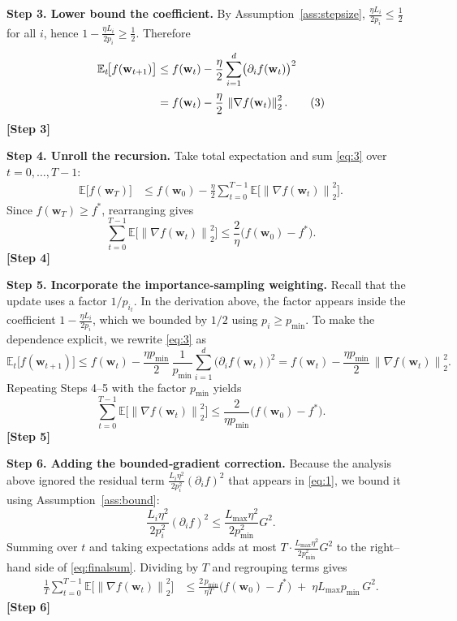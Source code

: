 \documentclass[11pt]{article}
\newcommand{\EE}{\mathbb{E}}
\newcommand{\norm}[1]{\left\|#1\right\|}
\newcommand{\grad}[1]{\nabla #1}
\begin{document}
\bigskip
\noindent\textbf{Step 3. Lower bound the coefficient.}  
By Assumption~\ref{ass:stepsize},
$\displaystyle \frac{\eta L_i}{2p_i}\le\frac12$ for all $i$, hence
$1-\frac{\eta L_i}{2p_i}\ge\frac12$.  Therefore
\begin{align}
\EE_t\!\bigl[f(\mathbf{w}_{t+1})\bigr]
&\le f(\mathbf{w}_t)
- \frac{\eta}{2}\sum_{i=1}^{d}
\bigl(\partial_i f(\mathbf{w}_t)\bigr)^{2}
\notag\\[0.4ex]
&= f(\mathbf{w}_t)-\frac{\eta}{2}\,\norm{\grad f(\mathbf{w}_t)}_2^{2}.
\tag{3}
\end{align}
\noindent\textbf{[Step 3]}

\bigskip
\noindent\textbf{Step 4. Unroll the recursion.}  
Take total expectation and sum \eqref{eq:3} over $t=0,\dots ,T-1$:
\begin{align}
\EE\!\bigl[f(\mathbf{w}_T)\bigr]
&\le f(\mathbf{w}_0)-\frac{\eta}{2}\sum_{t=0}^{T-1}
\EE\!\bigl[\norm{\grad f(\mathbf{w}_t)}_2^{2}\bigr].
\tag{4}
\end{align}
Since $f(\mathbf{w}_T)\ge f^{*}$, rearranging gives
\[
\sum_{t=0}^{T-1}\EE\!\bigl[\norm{\grad f(\mathbf{w}_t)}_2^{2}\bigr]
\le \frac{2}{\eta}\bigl(f(\mathbf{w}_0)-f^{*}\bigr).
\tag{5}
\]
\noindent\textbf{[Step 4]}

\bigskip
\noindent\textbf{Step 5. Incorporate the importance‑sampling weighting.}  
Recall that the update uses a factor $1/p_{i_t}$.  In the derivation above,
the factor appears inside the coefficient
$1-\frac{\eta L_i}{2p_i}$, which we bounded by $1/2$ using
$p_i\ge p_{\min}$.  To make the dependence explicit, we rewrite
\eqref{eq:3} as
\[
\EE_t\!\bigl[f(\mathbf{w}_{t+1})\bigr]
\le f(\mathbf{w}_t)
- \frac{\eta p_{\min}}{2}\,
\frac{1}{p_{\min}}\sum_{i=1}^{d}
\bigl(\partial_i f(\mathbf{w}_t)\bigr)^{2}
=
f(\mathbf{w}_t)-\frac{\eta p_{\min}}{2}\,
\norm{\grad f(\mathbf{w}_t)}_2^{2}.
\tag{6}
\]
Repeating Steps 4–5 with the factor $p_{\min}$ yields
\begin{equation}
\label{eq:finalsum}
\sum_{t=0}^{T-1}\EE\!\bigl[\norm{\grad f(\mathbf{w}_t)}_2^{2}\bigr]
\le
\frac{2}{\eta p_{\min}}\bigl(f(\mathbf{w}_0)-f^{*}\bigr).
\tag{7}
\end{equation}
\noindent\textbf{[Step 5]}

\bigskip
\noindent\textbf{Step 6. Adding the bounded‑gradient correction.}  
Because the analysis above ignored the residual term
$\frac{L_i\eta^{2}}{2p_i^{2}}(\partial_i f)^2$ that appears in \eqref{eq:1},
we bound it using Assumption~\ref{ass:bound}:
\[
\frac{L_i\eta^{2}}{2p_i^{2}}(\partial_i f)^2
\le \frac{L_{\max}\eta^{2}}{2p_{\min}^{2}}G^{2}.
\]
Summing over $t$ and taking expectations adds at most
$T\cdot\frac{L_{\max}\eta^{2}}{2p_{\min}^{2}}G^{2}$ to the right–hand side of
\eqref{eq:finalsum}.  Dividing by $T$ and regrouping terms gives
\begin{align}
\frac{1}{T}\sum_{t=0}^{T-1}\EE\!\bigl[\norm{\grad f(\mathbf{w}_t)}_2^{2}\bigr]
&\le
\frac{2\,p_{\min}}{\eta T}\bigl(f(\mathbf{w}_0)-f^{*}\bigr)
\;+\;
\eta L_{\max}p_{\min}\,G^{2}.
\tag{8}
\end{align}
\noindent\textbf{[Step 6]}
\end{document}
